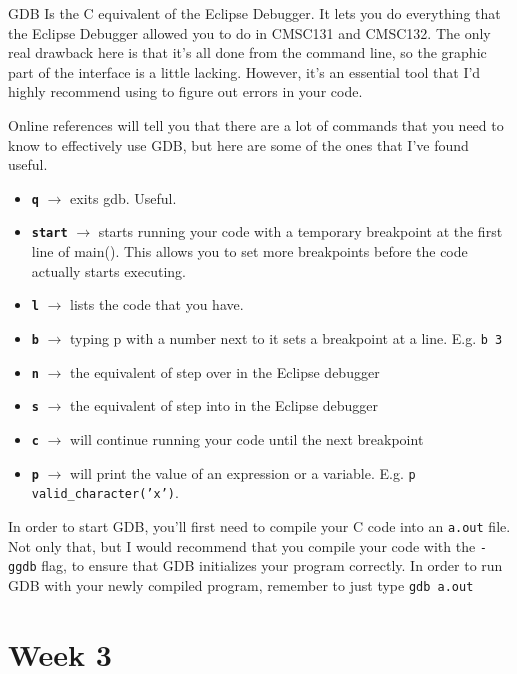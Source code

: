 \documentclass[english, 10pt]{article}
\begin{document}
GDB Is the C equivalent of the Eclipse Debugger. It lets you do everything that the Eclipse Debugger allowed you to do in CMSC131 and CMSC132. The only real drawback here is that it's all done from the command line, so the graphic part of the interface is a little lacking. However, it's an essential tool that I'd highly recommend using to figure out errors in your code.\newline

Online references will tell you that there are a lot of commands that you need to know to effectively use GDB, but here are some of the ones that I've found useful.

\begin{itemize}
	\item \textbf{\texttt{q}} $\rightarrow$ exits gdb. Useful.
	\item \textbf{\texttt{start}} $\rightarrow$ starts running your code with a temporary breakpoint at the first line of main(). This allows you to set more breakpoints before the code actually starts executing.
	\item \textbf{\texttt{l}} $\rightarrow$ lists the code that you have.
	\item \textbf{\texttt{b}} $\rightarrow$ typing p with a number next to it sets a breakpoint at a line. E.g. \texttt{b 3}
	\item \textbf{\texttt{n}} $\rightarrow$ the equivalent of step over in the Eclipse debugger
	\item \textbf{\texttt{s}} $\rightarrow$ the equivalent of step into in the Eclipse debugger
	\item \textbf{\texttt{c}} $\rightarrow$ will continue running your code until the next breakpoint
	\item \textbf{\texttt{p}} $\rightarrow$ will print the value of an expression or a variable. E.g. \texttt{p valid\_character('x')}.
\end{itemize}

In order to start GDB, you'll first need to compile your C code into an \texttt{a.out} file. Not only that, but I would recommend that you compile your code with the \texttt{-ggdb} flag, to ensure that GDB initializes your program correctly. In order to run GDB with your newly compiled program, remember to just type \texttt{gdb a.out}\newline 

\section{Week 3}
\end{document}
